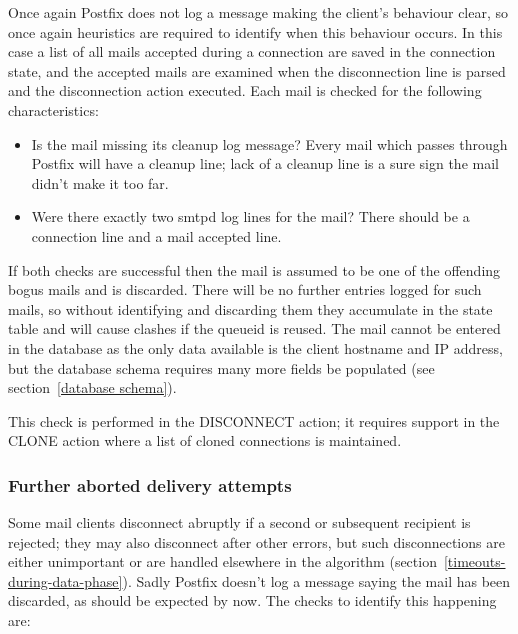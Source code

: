 \documentclass[a4paper,12pt,draft]{article}
\begin{document}
Once again Postfix does not log a message making the client's behaviour
clear, so once again heuristics are required to identify when this
behaviour occurs.  In this case a list of all mails accepted during a
connection are saved in the connection state, and the accepted mails are
examined when the disconnection line is parsed and the disconnection action
executed.  Each mail is checked for the following characteristics:

\begin{itemize}

    \item Is the mail missing its cleanup log message?  Every mail which
        passes through Postfix will have a cleanup line; lack of a cleanup
        line is a sure sign the mail didn't make it too far.

    \item Were there exactly two smtpd log lines for the mail?  There
        should be a connection line and a mail accepted line.

\end{itemize}

If both checks are successful then the mail is assumed to be one of the
offending bogus mails and is discarded.  There will be no further entries
logged for such mails, so without identifying and discarding them they
accumulate in the state table and will cause clashes if the queueid is
reused.  The mail cannot be entered in the database as the only data
available is the client hostname and IP address, but the database schema
requires many more fields be populated (see section~\ref{database schema}).

This check is performed in the DISCONNECT action; it requires support in
the CLONE action where a list of cloned connections is maintained.

\subsubsection{Further aborted delivery attempts}

Some mail clients disconnect abruptly if a second or subsequent recipient
is rejected; they may also disconnect after other errors, but such
disconnections are either unimportant or are handled elsewhere in the
algorithm (section~\ref{timeouts-during-data-phase}).  Sadly Postfix
doesn't log a message saying the mail has been discarded, as should be
expected by now.  The checks to identify this happening are:
\end{document}
